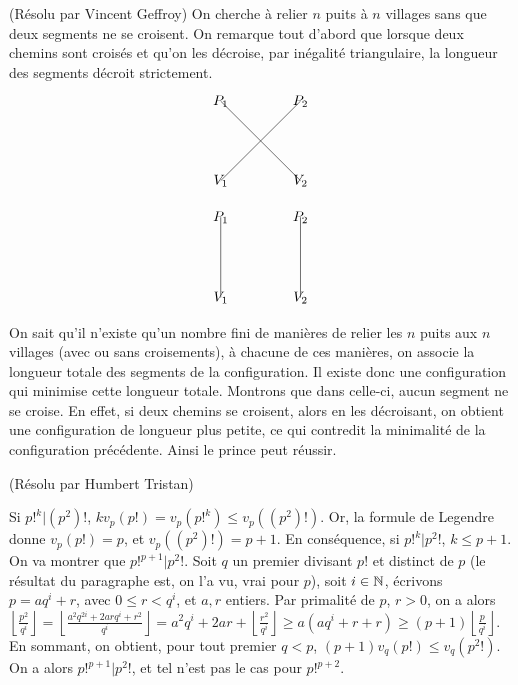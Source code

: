 \begin{sol}[62](Résolu par Vincent Geffroy)
On cherche \`a relier $n$ puits \`a $n$ villages sans que deux segments ne se croisent.
On remarque tout d'abord que lorsque deux chemins sont crois\'es et qu'on les d\'ecroise, par in\'egalit\'e triangulaire, la longueur des segments d\'ecroit strictement.
\[\begin{tikzpicture}[scale=1]
\draw (0, 0)--(2,2 );
\draw (2, 0)--(0,2 );
\node at (0,0) {$V_1$};
\node at (2,0) {$V_2$};
\node at (0,2) {$P_1$};
\node at (2,2) {$P_2$};

\end{tikzpicture}\]

\[\begin{tikzpicture}[scale=1]
\draw (0, 0)--(0,2 );
\draw (2, 0)--(2,2 );
\node at (0,0) {$V_1$};
\node at (2,0) {$V_2$};
\node at (0,2) {$P_1$};
\node at (2,2) {$P_2$};

\end{tikzpicture}\]

On sait qu'il n'existe qu'un nombre fini de mani\`eres de relier les $n$ puits aux $n$ villages (avec ou sans croisements), \`a chacune de ces mani\`eres, on associe la longueur totale des segments de la configuration. Il existe donc une configuration qui minimise cette longueur totale.
Montrons que dans celle-ci, aucun segment ne se croise.
En effet, si deux chemins se croisent, alors en les d\'ecroisant, on obtient une configuration de longueur plus petite, ce qui contredit la minimalit\'e de la configuration pr\'ec\'edente.
Ainsi le prince peut r\'eussir.

\end{sol}

\begin{sol}[64](R\'esolu par Humbert Tristan)

		Si $p!^k | (p^2)!$, $kv_p(p!) = v_p(p!^k) \leq v_p((p^2)!)$. 
		Or, la formule de Legendre donne $v_p(p!)=p$, et $v_p((p^2)!)=p+1$. En cons\'equence, si $p!^k | p^2!$, $k \leq p+1$. \\
		On va montrer que $p!^{p+1} | p^2!$. Soit $q$ un premier divisant $p!$ et distinct de $p$ (le r\'esultat du paragraphe est, on l'a vu, vrai pour $p$), soit $i \in \mathbb{N}$, \'ecrivons $p=aq^i+r$, avec $0 \leq r < q^i$, et $a,r$ entiers. Par primalit\'e de $p$, $r > 0$, on a alors \\ $\left\lfloor \frac{p^2}{q^i}\right\rfloor = \left\lfloor \frac{a^2q^{2i}+2arq^i+r^2}{q^i}\right\rfloor=a^2q^i+2ar+\left\lfloor \frac{r^2}{q^i}\right\rfloor \geq a(aq^i+r+r) \geq (p+1) \left\lfloor \frac{p}{q^i}\right\rfloor$. En sommant, on obtient, pour tout premier $q < p$, $(p+1)v_q(p!) \leq v_q(p^2!)$. \\
		On a alors $p!^{p+1} | p^2!$, et tel n'est pas le cas pour $p!^{p+2}$. 
\end{sol}

